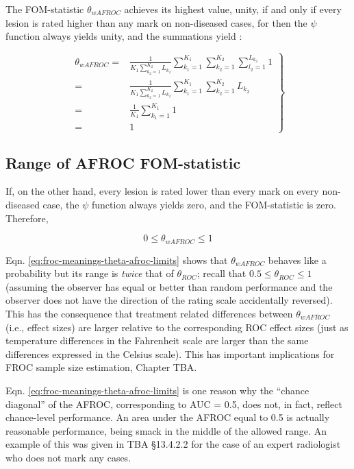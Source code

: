 \documentclass[
]{book}
\begin{document}
The FOM-statistic \(\theta_{wAFROC}\) achieves its highest value, unity, if and only if every lesion is rated higher than any mark on non-diseased cases, for then the \(\psi\) function always yields unity, and the summations yield :

\begin{equation}
\left. 
\begin{aligned}
\theta_{wAFROC}=& \frac{1}{K_1 \sum_{k_2=1}^{K_2}L_{k_2}}\sum_{k_1=1}^{K_1}\sum_{k_2=1}^{K_2}\sum_{l_2=1}^{L_{k_2}}  1 \\
= & \frac{1}{K_1 \sum_{k_2=1}^{K_2}L_{k_2}}\sum_{k_1=1}^{K_1}\sum_{k_2=1}^{K_2}L_{k_2} \\
= & \frac{1}{K_1}\sum_{k_1=1}^{K_1}1\\
= & 1
\end{aligned}
\right \}
\label{eq:froc-meanings-theta-afroc-unity}
\end{equation}

\hypertarget{range-of-afroc-fom-statistic}{%
\subsection{Range of AFROC FOM-statistic}\label{range-of-afroc-fom-statistic}}

If, on the other hand, every lesion is rated lower than every mark on every non-diseased case, the \(\psi\) function always yields zero, and the FOM-statistic is zero. Therefore,

\begin{equation}
0 \leq \theta_{wAFROC} \leq 1
\label{eq:froc-meanings-theta-afroc-limits}
\end{equation}

Eqn. \eqref{eq:froc-meanings-theta-afroc-limits} shows that \(\theta_{wAFROC}\) behaves like a probability but its range is \emph{twice} that of \(\theta_{ROC}\); recall that \(0.5 \leq \theta_{ROC} \leq 1\) (assuming the observer has equal or better than random performance and the observer does not have the direction of the rating scale accidentally reversed). This has the consequence that treatment related differences between \(\theta_{wAFROC}\) (i.e., effect sizes) are larger relative to the corresponding ROC effect sizes (just as temperature differences in the Fahrenheit scale are larger than the same differences expressed in the Celsius scale). This has important implications for FROC sample size estimation, Chapter TBA.

Eqn. \eqref{eq:froc-meanings-theta-afroc-limits} is one reason why the ``chance diagonal'' of the AFROC, corresponding to AUC = 0.5, does not, in fact, reflect chance-level performance. An area under the AFROC equal to 0.5 is actually reasonable performance, being smack in the middle of the allowed range. An example of this was given in TBA §13.4.2.2 for the case of an expert radiologist who does not mark any cases.
\end{document}
